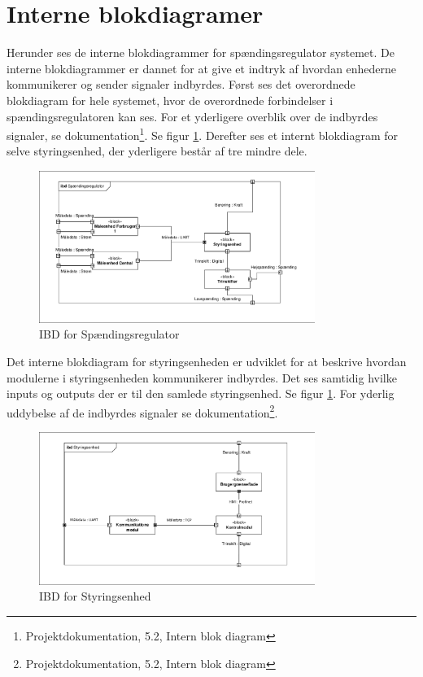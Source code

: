 

\section{Interne blokdiagramer}

Herunder ses de interne blokdiagrammer for spændingsregulator systemet. De interne blokdiagrammer er dannet for at give et indtryk af hvordan enhederne kommunikerer og sender signaler indbyrdes. Først ses det overordnede blokdiagram for hele systemet, hvor de overordnede forbindelser i spændingsregulatoren kan ses. For et yderligere overblik over de indbyrdes signaler, se dokumentation\footnote{Projektdokumentation, 5.2, Intern blok diagram}. Se figur \ref{fig:IBDSp}. Derefter ses et internt blokdiagram for selve styringsenhed, der yderligere består af tre mindre dele. 

\begin{figure}[htbp] %
	\centering
	\includegraphics[width=0.8\textwidth]{figure/IBDSpaendingsregulator.pdf}
	\caption{IBD for Spændingsregulator}
	\label{fig:IBDSp}
\end{figure}

Det interne blokdiagram for styringsenheden er udviklet for at beskrive hvordan modulerne i styringsenheden kommunikerer indbyrdes. Det ses samtidig hvilke inputs og outputs der er til den samlede styringsenhed. Se figur \ref{fig:IBDSp}. For yderlig uddybelse af de indbyrdes signaler se dokumentation\footnote{Projektdokumentation, 5.2, Intern blok diagram}.


\begin{figure}[htbp] %
	\centering
	\includegraphics[width=0.8\textwidth]{figure/IBDStyringsenhed.pdf}
	\caption{IBD for Styringsenhed}
	\label{fig:IBDSt}
\end{figure} 
	 




